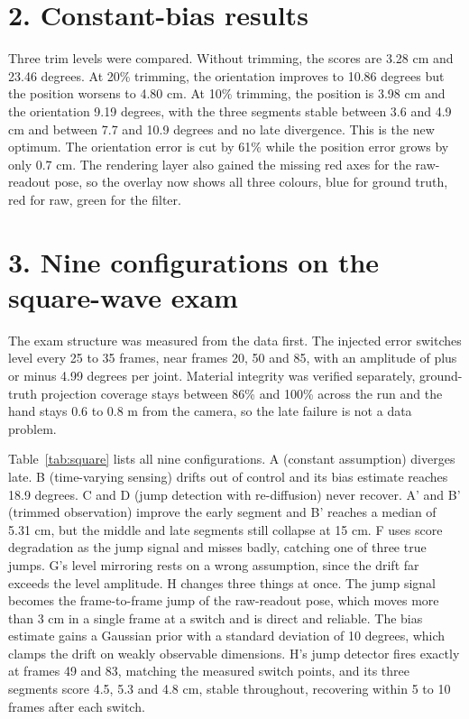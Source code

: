 \documentclass{article}
\begin{document}
\section{2. Constant-bias results}
Three trim levels were compared. Without trimming, the scores are 3.28 cm and 23.46 degrees. At 20\% trimming, the orientation improves to 10.86 degrees but the position worsens to 4.80 cm. At 10\% trimming, the position is 3.98 cm and the orientation 9.19 degrees, with the three segments stable between 3.6 and 4.9 cm and between 7.7 and 10.9 degrees and no late divergence. This is the new optimum. The orientation error is cut by 61\% while the position error grows by only 0.7 cm. The rendering layer also gained the missing red axes for the raw-readout pose, so the overlay now shows all three colours, blue for ground truth, red for raw, green for the filter.

\section{3. Nine configurations on the square-wave exam}
The exam structure was measured from the data first. The injected error switches level every 25 to 35 frames, near frames 20, 50 and 85, with an amplitude of plus or minus 4.99 degrees per joint. Material integrity was verified separately, ground-truth projection coverage stays between 86\% and 100\% across the run and the hand stays 0.6 to 0.8 m from the camera, so the late failure is not a data problem.

Table~\ref{tab:square} lists all nine configurations. A (constant assumption) diverges late. B (time-varying sensing) drifts out of control and its bias estimate reaches 18.9 degrees. C and D (jump detection with re-diffusion) never recover. A' and B' (trimmed observation) improve the early segment and B' reaches a median of 5.31 cm, but the middle and late segments still collapse at 15 cm. F uses score degradation as the jump signal and misses badly, catching one of three true jumps. G's level mirroring rests on a wrong assumption, since the drift far exceeds the level amplitude. H changes three things at once. The jump signal becomes the frame-to-frame jump of the raw-readout pose, which moves more than 3 cm in a single frame at a switch and is direct and reliable. The bias estimate gains a Gaussian prior with a standard deviation of 10 degrees, which clamps the drift on weakly observable dimensions. H's jump detector fires exactly at frames 49 and 83, matching the measured switch points, and its three segments score 4.5, 5.3 and 4.8 cm, stable throughout, recovering within 5 to 10 frames after each switch.
\end{document}
